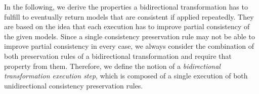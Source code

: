 In the following, we derive the properties a bidirectional transformation has to fulfill to eventually return models that are consistent if applied repeatedly.
They are based on the idea that each execution has to improve partial consistency of the given models.
Since a single consistency preservation rule may not be able to improve partial consistency in every case, we always consider the combination of both preservation rules of a bidirectional transformation and require that property from them.
Therefore, we define the notion of a \emph{bidirectional transformation execution step}, which is composed of a single execution of both unidirectional consistency preservation rules.

